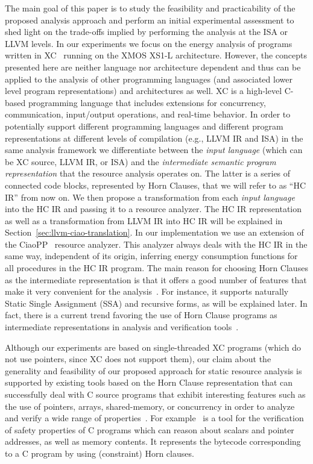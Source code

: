 \documentclass{llncs}
\newcommand{\level}{level\xspace}
\newcommand{\levels}{levels\xspace}
\newcommand{\hcir}{HC IR\xspace}
\newcommand{\llvmir}{LLVM IR\xspace}
\newcommand{\llvm}{LLVM\xspace}
\newcommand{\ciaopp}{CiaoPP\xspace}
\begin{document}
The main goal of this paper is to study the feasibility and
practicability of the proposed analysis approach and perform an
initial experimental assessment to shed light on the trade-offs implied
by performing the analysis at the ISA or \llvm \levels.
In our experiments
we focus on the energy analysis of programs written in
XC~\cite{Watt2009}
running on the XMOS XS1-L architecture.  However, the concepts
presented here are neither language nor architecture dependent and
thus can be applied to the analysis of other programming languages
(and associated lower \level program representations) and
architectures as well.
XC is a high-level C-based programming language that includes
extensions for concurrency, communication, input/output operations,
and real-time behavior.   
In order to potentially support different programming languages and
different program representations at different \levels of compilation
(e.g., \llvmir and ISA)
in the same analysis framework 
we differentiate between the \emph{input language} (which can be XC
source, \llvmir, or ISA) and the \emph{intermediate semantic program
  representation} that the resource analysis operates on. The latter
is a series of connected code blocks, represented by Horn Clauses,
that we will refer to as ``\hcir'' from now on.
We then propose a transformation from each \emph{input language} into
the \hcir and passing it to a resource analyzer. 
The \hcir representation as well as a transformation from \llvmir into \hcir will be 
explained in Section~\ref{sec:llvm-ciao-translation}.
In our implementation we use an extension of the
\ciaopp~\cite{ciaopp-sas03-journal-scp} resource analyzer. This
analyzer always deals with the \hcir  in the same way, independent of
its origin,
inferring energy consumption functions for all procedures in the \hcir
program.
The main reason for choosing Horn Clauses as the intermediate
representation is that it offers a good number of features that make
it very convenient for the
analysis~\cite{decomp-oo-prolog-lopstr07}. For instance, it supports
naturally Static Single Assignment (SSA) and recursive forms, 
as will be explained later.  
In fact, there is a current trend favoring the use of Horn Clause
programs as intermediate representations in analysis and verification
tools~\cite{DBLP:conf/tacas/GrebenshchikovGLPR12,DBLP:conf/fm/HojjatKGIKR12-short,z3,hcvs14}.

Although our experiments are based on single-threaded XC programs
(which do not use pointers, since XC does not support them), our claim
about the generality and feasibility of our proposed approach for
static resource analysis is supported by existing tools based on the
Horn Clause representation that can successfully deal with C source
programs that exhibit interesting features such as the use of
pointers, arrays, shared-memory, or concurrency in order to analyze
and verify a wide range of
properties~\cite{DBLP:conf/tacas/GrebenshchikovGLPR12,DBLP:conf/fm/HojjatKGIKR12-short,DBLP:conf/tacas/GurfinkelKN15-short}. For
example~\cite{DBLP:conf/tacas/GurfinkelKN15-short} is a tool for the
verification of safety properties of C programs which can reason about
scalars and pointer addresses, as well as memory contents. It
represents the bytecode corresponding to a C program by using
(constraint) Horn clauses.
\end{document}
